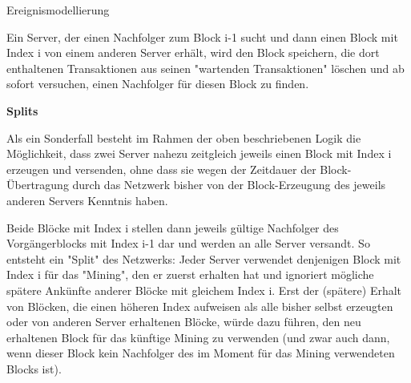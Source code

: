 \documentclass{article}
\begin{document}
\begin{exercise}{Ereignismodellierung}
  \par Ein Server, der einen Nachfolger zum Block i-1 sucht und dann einen Block mit Index i von einem anderen Server erhält, wird den Block speichern, die dort enthaltenen Transaktionen aus seinen "wartenden Transaktionen" löschen und ab sofort versuchen, einen Nachfolger für diesen Block zu finden.

  \textbf{Splits}

  Als ein Sonderfall besteht im Rahmen der oben beschriebenen Logik die Möglichkeit, dass zwei Server nahezu zeitgleich jeweils einen Block mit Index i erzeugen und versenden, ohne dass sie wegen der Zeitdauer der Block-Übertragung durch das Netzwerk bisher von der Block-Erzeugung des jeweils anderen Servers Kenntnis haben.
  \par Beide Blöcke mit Index i stellen dann jeweils gültige Nachfolger des Vorgängerblocks mit Index i-1 dar und werden an alle Server versandt. So entsteht ein "Split" des Netzwerks: Jeder Server verwendet denjenigen Block mit Index i für das "Mining", den er zuerst erhalten hat und ignoriert mögliche spätere Ankünfte anderer Blöcke mit gleichem Index i. Erst der (spätere) Erhalt von Blöcken, die einen höheren Index aufweisen als alle bisher selbst erzeugten oder von anderen Server erhaltenen Blöcke, würde dazu führen, den neu erhaltenen Block für das künftige Mining zu verwenden (und zwar auch dann, wenn dieser Block kein Nachfolger des im Moment für das Mining verwendeten Blocks ist).


\end{exercise}
\end{document}
